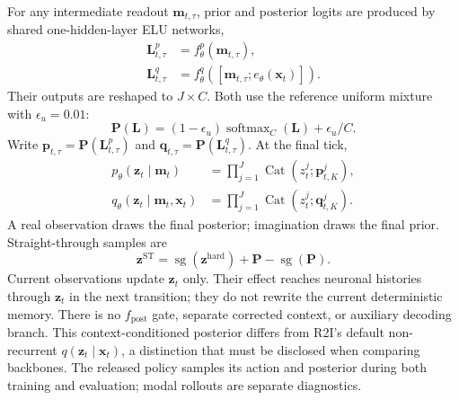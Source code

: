 \documentclass{article}
\begin{document}
For any intermediate readout $\mathbf m_{t,\tau}$, prior and posterior logits are produced by shared one-hidden-layer ELU networks,
\begin{align}
\mathbf L^p_{t,\tau}&=f_\theta^p(\mathbf m_{t,\tau}),
\label{eq:ct_dynamics_predictor}\\
\mathbf L^q_{t,\tau}&=f_\theta^q([\mathbf m_{t,\tau};e_\theta(\mathbf x_t)]).
\label{eq:ct_encoder}
\end{align}
Their outputs are reshaped to $J\times C$. Both use the reference uniform mixture with $\epsilon_u=0.01$:
\begin{equation}
\mathbf P(\mathbf L)=(1-\epsilon_u)\operatorname{softmax}_C(\mathbf L)+\epsilon_u/C.
\label{eq:categorical_unimix}
\end{equation}
Write $\mathbf p_{t,\tau}=\mathbf P(\mathbf L^p_{t,\tau})$ and $\mathbf q_{t,\tau}=\mathbf P(\mathbf L^q_{t,\tau})$. At the final tick,
\begin{align}
p_\theta(\mathbf z_t\mid\mathbf m_t)&=\prod_{j=1}^{J}\operatorname{Cat}(z_t^j;\mathbf p_{t,K}^j),\\
q_\theta(\mathbf z_t\mid\mathbf m_t,\mathbf x_t)&=\prod_{j=1}^{J}\operatorname{Cat}(z_t^j;\mathbf q_{t,K}^j).
\label{eq:ct_latent_distributions}
\end{align}
A real observation draws the final posterior; imagination draws the final prior. Straight-through samples are
\begin{equation}
\mathbf z^{\mathrm{ST}}=\operatorname{sg}(\mathbf z^{\mathrm{hard}})
+\mathbf P-\operatorname{sg}(\mathbf P).
\label{eq:categorical_st}
\end{equation}
Current observations update $\mathbf z_t$ only. Their effect reaches neuronal histories through $\mathbf z_t$ in the next transition; they do not rewrite the current deterministic memory. There is no $f_{\mathrm{post}}$ gate, separate corrected context, or auxiliary decoding branch. This context-conditioned posterior differs from R2I's default non-recurrent $q(\mathbf z_t\mid\mathbf x_t)$, a distinction that must be disclosed when comparing backbones. The released policy samples its action and posterior during both training and evaluation; modal rollouts are separate diagnostics.
\end{document}
